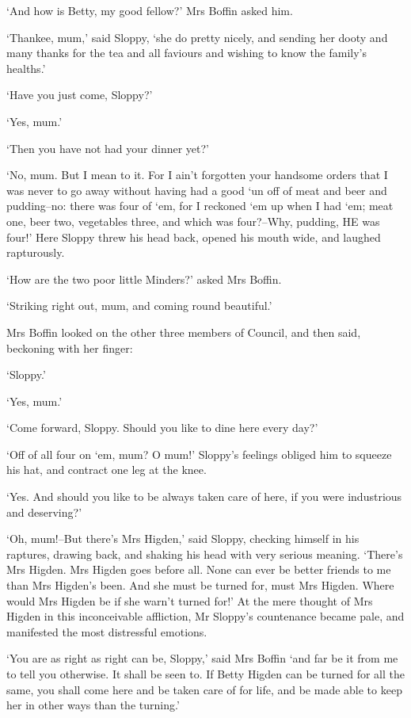 ‘And how is Betty, my good fellow?’ Mrs Boffin asked him.

‘Thankee, mum,’ said Sloppy, ‘she do pretty nicely, and sending her
dooty and many thanks for the tea and all faviours and wishing to know
the family’s healths.’

‘Have you just come, Sloppy?’

‘Yes, mum.’

‘Then you have not had your dinner yet?’

‘No, mum. But I mean to it. For I ain’t forgotten your handsome orders
that I was never to go away without having had a good ‘un off of meat
and beer and pudding--no: there was four of ‘em, for I reckoned ‘em
up when I had ‘em; meat one, beer two, vegetables three, and which was
four?--Why, pudding, HE was four!’ Here Sloppy threw his head back,
opened his mouth wide, and laughed rapturously.

‘How are the two poor little Minders?’ asked Mrs Boffin.

‘Striking right out, mum, and coming round beautiful.’

Mrs Boffin looked on the other three members of Council, and then said,
beckoning with her finger:

‘Sloppy.’

‘Yes, mum.’

‘Come forward, Sloppy. Should you like to dine here every day?’

‘Off of all four on ‘em, mum? O mum!’ Sloppy’s feelings obliged him to
squeeze his hat, and contract one leg at the knee.

‘Yes. And should you like to be always taken care of here, if you were
industrious and deserving?’

‘Oh, mum!--But there’s Mrs Higden,’ said Sloppy, checking himself in his
raptures, drawing back, and shaking his head with very serious meaning.
‘There’s Mrs Higden. Mrs Higden goes before all. None can ever be better
friends to me than Mrs Higden’s been. And she must be turned for, must
Mrs Higden. Where would Mrs Higden be if she warn’t turned for!’ At the
mere thought of Mrs Higden in this inconceivable affliction, Mr Sloppy’s
countenance became pale, and manifested the most distressful emotions.

‘You are as right as right can be, Sloppy,’ said Mrs Boffin ‘and far be
it from me to tell you otherwise. It shall be seen to. If Betty Higden
can be turned for all the same, you shall come here and be taken care of
for life, and be made able to keep her in other ways than the turning.’

